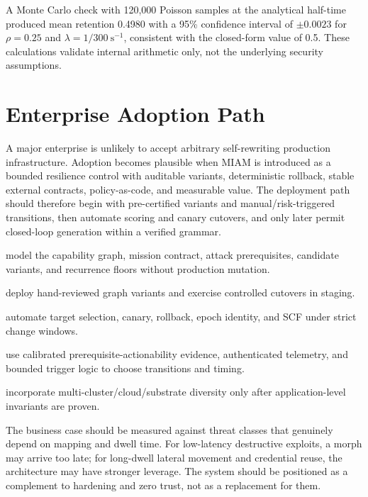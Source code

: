 \documentclass[11pt,letterpaper]{article}
\begin{document}
A Monte Carlo check with 120,000 Poisson samples at the analytical half-time produced mean retention 0.4980 with a 95\% confidence interval of $\pm0.0023$ for $\rho=0.25$ and $\lambda=1/300\ \mathrm{s}^{-1}$, consistent with the closed-form value of 0.5. These calculations validate internal arithmetic only, not the underlying security assumptions.

\section{Enterprise Adoption Path}

A major enterprise is unlikely to accept arbitrary self-rewriting production infrastructure. Adoption becomes plausible when MIAM is introduced as a bounded resilience control with auditable variants, deterministic rollback, stable external contracts, policy-as-code, and measurable value. The deployment path should therefore begin with pre-certified variants and manual/risk-triggered transitions, then automate scoring and canary cutovers, and only later permit closed-loop generation within a verified grammar.

\begin{description}[leftmargin=1.5em,itemsep=2pt,font=\normalfont\bfseries]
\item[Phase 0, offline digital twin:] model the capability graph, mission contract, attack prerequisites, candidate variants, and recurrence floors without production mutation.
\item[Phase 1, pre-certified pool:] deploy hand-reviewed graph variants and exercise controlled cutovers in staging.
\item[Phase 2, production bounded morphing:] automate target selection, canary, rollback, epoch identity, and SCF under strict change windows.
\item[Phase 3, risk-adaptive morphing:] use calibrated prerequisite-actionability evidence, authenticated telemetry, and bounded trigger logic to choose transitions and timing.
\item[Phase 4, cross-substrate resilience:] incorporate multi-cluster/cloud/substrate diversity only after application-level invariants are proven.
\end{description}

The business case should be measured against threat classes that genuinely depend on mapping and dwell time. For low-latency destructive exploits, a morph may arrive too late; for long-dwell lateral movement and credential reuse, the architecture may have stronger leverage. The system should be positioned as a complement to hardening and zero trust, not as a replacement for them.
\end{document}

